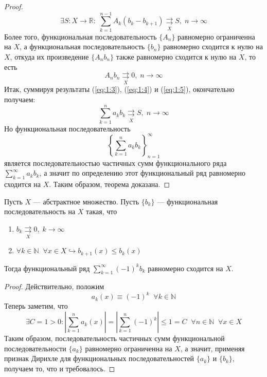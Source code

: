 \documentclass[11pt]{article}
\begin{document}
\begin{proof}
    \begin{equation} \label{eq:1:4}
        \exists S \colon X \to \mathbb{R}: \; \sum_{k = 1}^{n - 1} A_k \left(b_k - b_{k + 1}\right) \underset{X}{\rightrightarrows} S, \; n \to \infty
    \end{equation}
    Более того, функциональная последовательность $\{A_n\}$ равномерно ограниченна на $X$, а функциональная последовательность $\{b_n\}$ равномерно сходится к нулю на $X$, откуда их произведение $\{A_n b_n\}$ также равномерно сходится к нулю на $X$, то есть
    \begin{equation} \label{eq:1:5}
        A_n b_n \underset{X}{\rightrightarrows} 0, \; n \to \infty
    \end{equation}
    Итак, суммируя результаты (\ref{eq:1:3}), (\ref{eq:1:4}) и (\ref{eq:1:5}), окончательно получаем:
    \[\sum_{k = 1}^n a_k b_k \underset{X}{\rightrightarrows} S, \; n \to \infty\]
    Но функциональная последовательность 
    \[\displaystyle \left\{\sum_{k = 1}^n a_k b_k \right\}_{n = 1}^{\infty}\] 
    является последовательностью частичных сумм функционального ряда $\displaystyle \sum_{k = 1}^{\infty} a_k b_k$, а значит по определению этот функциональный ряд равномерно сходится на $X$. Таким образом, теорема доказана.
\end{proof}

\begin{consequence}
    Пусть $X$ --- абстрактное множество. Пусть $\{b_k\}$ --- функциональная последовательность на $X$ такая, что
    \begin{enumerate}
        \item $b_k \underset{X}{\rightrightarrows} 0, \; k \to \infty$
        \item $\forall k \in \mathbb{N} \; \; \forall x \in X \hookrightarrow b_{k + 1} (x) \leq b_k (x)$
    \end{enumerate}
    Тогда функциональный ряд $\displaystyle \sum_{k = 1}^{\infty} (-1)^k b_k$ равномерно сходится на $X$.
\end{consequence}

\begin{proof}
    Действительно, положим
    \[a_k (x) \equiv (-1)^k \; \; \forall k \in \mathbb{N}\]
    Теперь заметим, что
    \[\exists C = 1 > 0: \left\lvert \sum_{k = 1}^n a_k (x) \right\rvert = \left\lvert \sum_{k = 1}^n (-1)^k \right\rvert \leq 1 = C \; \; \forall n \in \mathbb{N} \; \; \forall x \in X\]
    Таким образом, последовательность частичных сумм функциональной последовательности $\{a_k\}$ равномерно ограниченна на $X$, а значит, применяя признак Дирихле для функциональных последовательностей $\{a_k\}$ и $\{b_k\}$, получаем то, что и требовалось.
\end{proof}
\end{document}
